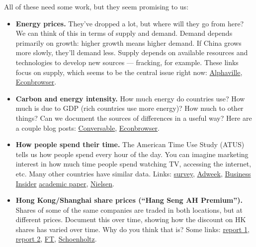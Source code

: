 \documentclass[11pt]{article}
\begin{document}
All of these need some work, but they seem promising to us:
\begin{itemize}
\item {\bf Energy prices.\/}
They've dropped a lot, but where will they go from here?  We can think of this in terms of supply and demand.  Demand depends primarily on growth:  higher growth means higher demand.  If China grows more slowly, they’ll demand less.  Supply depends on available resources and technologies to develop new sources --- fracking, for example.  These links focus on supply, which seems to be the central issue right now:
\href{http://ftalphaville.ft.com/2015/09/11/2139891/oil-absolutely-friggin-everywhere/}{Alphaville},
\href{http://econbrowser.com/archives/2014/11/a-glut-of-oil}{Econbrowser}.

\item {\bf Carbon and energy intensity.}
How much energy do countries use?  How much is due to GDP (rich countries use more energy)?  How much to other things?  Can we document the sources of differences in a useful way?  Here are a couple blog posts:
\href{http://conversableeconomist.blogspot.com/2015/07/global-carbon-intensity-rises-kaya.html}
{Conversable},
\href{http://econbrowser.com/archives/2014/06/energy-demand-and-gdp}{Econbrowser}.

\item {\bf How people spend their time.}
The American Time Use Study (ATUS) tells us how people spend every hour of the day.  You can imagine marketing interest in how much time people spend watching TV, accessing the internet, etc.  Many other countries have similar data.  Links:
\href{http://scholar.princeton.edu/sites/default/files/annurev-economics-111809-125129_0.pdf}{survey},
\href{http://www.adweek.com/socialtimes/time-spent-online/613474}{Adweek}, \href{http://www.businessinsider.com/how-much-time-people-spend-online-2013-10}{Business Insider} \href{http://www.nber.org/papers/w19549}{academic paper}, \href{http://www.nielsen.com/us/en/insights/news/2014/whats-empowering-the-new-digital-consumer.html}
{Nielsen}.

\item {\bf Hong Kong/Shanghai share prices (``Hang Seng AH Premium'').}
Shares of some of the same companies are traded in both locations, but at different prices.  Document this over time, showing how the discount on HK shares has varied over time.  Why do you think that is?  Some links:
\href{http://www.hsi.com.hk/HSI-Net/static/revamp/contents/en/dl_centre/factsheets/FS_AHPe.pdf}
{report 1},
\href{http://www.hsi.com.hk/HSI-Net/}{report 2},
\href{http://markets.ft.com/research/Markets/Tearsheets/Summary?s=HSCAHPI:HKG}{FT},
\href{http://www.moneyandbanking.com/commentary/2015/7/6/chinas-stock-market-boom-and-bust}
{Schoenholtz}.


\end{itemize}
\end{document}
